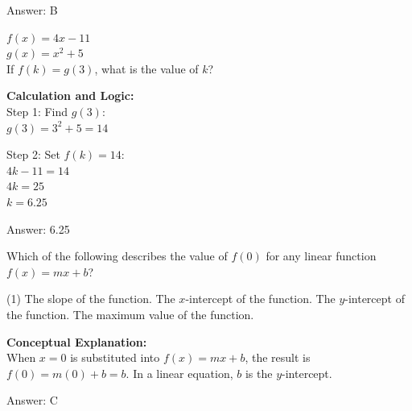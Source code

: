 \documentclass[11pt,paper=a4,answers]{exam}
\begin{document}
\begin{questions}
\begin{solution}
\vspace{30pt}

Answer: \colorbox{yellow!100}{B}
\end{solution}

\vspace{40pt}

\question
$f(x) = 4x - 11$ \\
$g(x) = x^2 + 5$ \\
If $f(k) = g(3)$, what is the value of $k$?

\begin{solution}
\textbf{Calculation and Logic:} \\
Step 1: Find $g(3)$: \\
$g(3) = 3^2 + 5 = 14$

\vspace{15pt}

Step 2: Set $f(k) = 14$: \\
$4k - 11 = 14$ \\
$4k = 25$ \\
$k = 6.25$

\vspace{30pt}

Answer: \colorbox{yellow!100}{6.25}
\end{solution}

\vspace{40pt}

\question
Which of the following describes the value of $f(0)$ for any linear function $f(x) = mx + b$?
\begin{tasks}(1)
    \task The slope of the function.
    \task The $x$-intercept of the function.
    \task The $y$-intercept of the function.
    \task The maximum value of the function.
\end{tasks}

\begin{solution}
\textbf{Conceptual Explanation:} \\
When $x=0$ is substituted into $f(x) = mx + b$, the result is $f(0) = m(0) + b = b$. In a linear equation, $b$ is the $y$-intercept.

\vspace{30pt}

Answer: \colorbox{yellow!100}{C}
\end{solution}

\vspace{40pt}


\end{questions}
\end{document}
